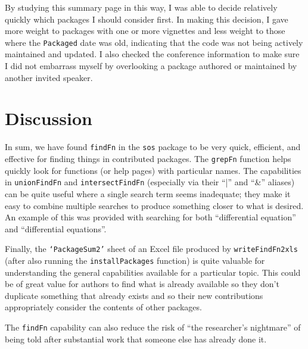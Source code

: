 By studying this summary page in this way, I was able to decide
relatively quickly which packages I should consider first.  In
making this decision, I gave more weight to packages with
one or more vignettes and less weight to those where the
{\tt Packaged} date was old, indicating that the code was not being
actively maintained and updated.  I also checked the conference
information to make sure I did not embarrass myself by overlooking
a package authored or maintained by another invited speaker.

\section*{Discussion}
In sum, we have found {\tt findFn} in the {\tt sos} package to
be very quick, efficient, and effective for finding things in
contributed packages.  The {\tt grepFn} function helps quickly
look for functions (or help pages) with particular names.
The capabilities in {\tt unionFindFn} and {\tt intersectFindFn}
(especially via their ``|'' and ``\&'' aliases) can be quite useful
where a single search term seems inadequate;  they make it easy
to combine multiple searches to produce something closer to what
is desired.  An example of this was provided with searching for
both ``differential equation'' and ``differential equations''.

Finally, the {\tt `PackageSum2'} sheet of an Excel file produced by
{\tt writeFindFn2xls} (after also running the {\tt installPackages}
function) is quite valuable for understanding the
general capabilities available for a particular topic.
This could be of great value for authors to find what is already
available so they don't duplicate something that already exists
and so their new contributions appropriately consider
the contents of other packages.

The {\tt findFn} capability can also reduce the risk
of ``the researcher's nightmare'' of being told after
substantial work that someone else has already done it.

